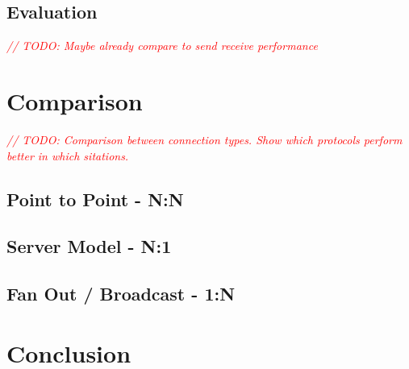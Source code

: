 \documentclass{article}
\newcommand{\todo}[1]{\textit{\textcolor{red}{// TODO: #1} }}
\theoremstyle{plain}
\theoremstyle{definition}
\theoremstyle{remark}
\begin{document}
\subsection{Evaluation}
\todo{Maybe already compare to send receive performance}

\pagebreak


\pagebreak



\pagebreak
\section{Comparison}
\todo{Comparison between connection types. Show which protocols perform better in which sitations.}

\subsection{Point to Point - N:N}

\subsection{Server Model - N:1}

\subsection{Fan Out / Broadcast - 1:N}

\pagebreak
\section{Conclusion}



\pagebreak


{}
\end{document}
